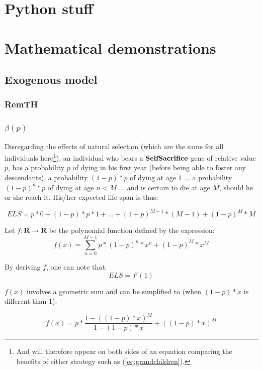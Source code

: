 \documentclass[a4paper,12pt]{report}
\begin{document}
\appendix

\chapter{Python stuff}
\label{a:scripts}
\chapter{Mathematical demonstrations}

\section{Exogenous model}
\subsection{RemTH}
\subsection{$\beta(p)$}
\label{beta}

Disregarding the effects of natural selection (which are the same for all individuals 
here\footnote{And will therefore appear on both sides of an equation comparing
the benefits of either strategy such as (\ref{eq:grandchildren}).}),
 an individual who bears a $\bf{SelfSacrifice}$ gene of relative value $p$, has a probability $p$ of dying in his first year
 (before being able to foster any descendants), a probability $(1-p)*p$ of dying at age $1$ ...
 a probability $(1-p)^{n}*p$ of dying at age $n<M$ ... and is certain to die at age $M$, should
 he or she reach it. His/her expected life span is thus:

 \[ ELS = p*0 + (1-p)*p*1 + ... + (1-p)^{M-1}*(M-1) + (1-p)^M*M \]

Let $f \colon \mathbf{R} \to \mathbf{R}$ be the polynomial function defined by the expression:
\[ f(x) = \sum_{n=0}^{M-1} p*(1-p)^n*x^n + (1-p)^M*x^M \]

By deriving $f$, one can note that:
\begin{equation}
    ELS = f'(1)
\label{eq_ELS_f}
\end{equation}

$f(x)$ involves a geometric sum and can be simplified to (when $(1-p)*x$ is different than 1):

\[ f(x) = p* \frac{1 - ((1-p)*x)^M}{1-(1-p)*x} + ((1-p)*x)^M \]
\end{document}
